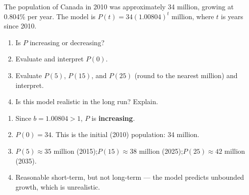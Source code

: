 \documentclass{ximera}
\begin{document}
\begin{problem}
The population of Canada in 2010 was approximately 34 million, growing at 0.804\% per year. The model is $P(t)=34(1.00804)^t$ million, where $t$ is years since 2010.
\begin{enumerate}
  \item[(a)] Is $P$ increasing or decreasing?
  \item[(b)] Evaluate and interpret $P(0)$.
  \item[(c)] Evaluate $P(5)$, $P(15)$, and $P(25)$ (round to the nearest million) and interpret.
  \item[(d)] Is this model realistic in the long run? Explain.
\end{enumerate}

\begin{solution}
\begin{enumerate}
  \item[(a)] Since $b=1.00804>1$, $P$ is \textbf{increasing}.
  \item[(b)] $P(0)=34$. This is the initial (2010) population: 34 million.
  \item[(c)] $P(5)\approx 35$ million (2015);\quad $P(15)\approx 38$ million (2025);\quad $P(25)\approx 42$ million (2035).
  \item[(d)] Reasonable short-term, but not long-term — the model predicts unbounded growth, which is unrealistic.
\end{enumerate}
\end{solution}
\end{problem}
\end{document}
